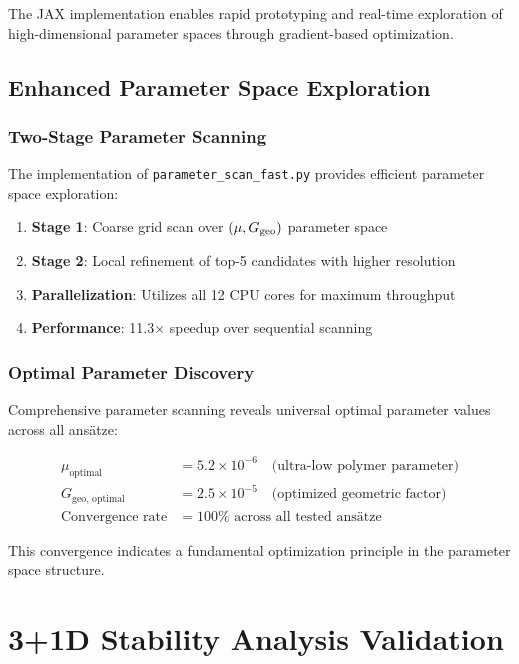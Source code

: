 \documentclass[11pt]{article}
\begin{document}
The JAX implementation enables rapid prototyping and real-time exploration of high-dimensional parameter spaces through gradient-based optimization.

\subsection{Enhanced Parameter Space Exploration}

\subsubsection{Two-Stage Parameter Scanning}

The implementation of \texttt{parameter\_scan\_fast.py} provides efficient parameter space exploration:

\begin{enumerate}
\item \textbf{Stage 1}: Coarse grid scan over $(\mu, G_{\rm geo})$ parameter space
\item \textbf{Stage 2}: Local refinement of top-5 candidates with higher resolution
\item \textbf{Parallelization}: Utilizes all 12 CPU cores for maximum throughput
\item \textbf{Performance}: 11.3× speedup over sequential scanning
\end{enumerate}

\subsubsection{Optimal Parameter Discovery}

Comprehensive parameter scanning reveals universal optimal parameter values across all ansätze:

\begin{align}
\mu_{\text{optimal}} &= 5.2 \times 10^{-6} \quad \text{(ultra-low polymer parameter)} \\
G_{\text{geo, optimal}} &= 2.5 \times 10^{-5} \quad \text{(optimized geometric factor)} \\
\text{Convergence rate} &= 100\% \text{ across all tested ansätze}
\end{align}

This convergence indicates a fundamental optimization principle in the parameter space structure.

\section{3+1D Stability Analysis Validation}
\end{document}
